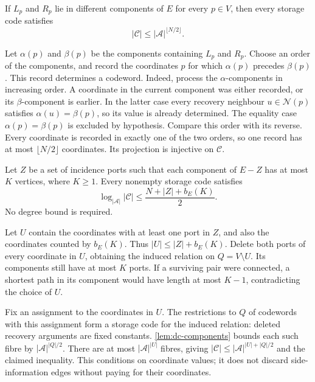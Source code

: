 \begin{lemma}
\label{lem:dc-components}
If $L_p$ and $R_p$ lie in different components of $E$ for every $p\in V$,
then every storage code satisfies
\[
  |\mathcal C|\le |\mathcal A|^{\lfloor N/2\rfloor}.
\]
\end{lemma}
\begin{outline}
Let $\alpha(p)$ and $\beta(p)$ be the components containing $L_p$ and $R_p$.
Choose an order of the components, and record the coordinates $p$ for which
$\alpha(p)$ precedes $\beta(p)$.  This record determines a codeword.
Indeed, process the $\alpha$-components in increasing order.  A coordinate
in the current component was either recorded, or its $\beta$-component is
earlier.  In the latter case every recovery neighbour $u\in\mathcal N(p)$
satisfies $\alpha(u)=\beta(p)$, so its value is already determined.
The equality case $\alpha(p)=\beta(p)$ is excluded by hypothesis.
Compare this order with its reverse. Every coordinate is recorded in exactly
one of the two orders, so one record has at most $\lfloor N/2\rfloor$
coordinates. Its projection is injective on $\mathcal C$.
\end{outline}

\begin{theorem}
\label{thm:dc-separator}
Let $Z$ be a set of incidence ports such that each component of $E-Z$
has at most $K$ vertices, where $K\ge1$.  Every nonempty storage code satisfies
\begin{equation}
 \log_{|\mathcal A|}|\mathcal C|
 \le \frac{N+|Z|+b_E(K)}2.
 \label{eq:dc-separator-bound}
\end{equation}
No degree bound is required.
\end{theorem}
\begin{outline}
Let $U$ contain the coordinates with at least one port in $Z$, and also
the coordinates counted by $b_E(K)$.  Thus $|U|\le |Z|+b_E(K)$.
Delete both ports of every coordinate in $U$, obtaining the induced
relation on $Q=V\setminus U$.  Its components still have at most $K$
ports.  If a surviving pair were connected, a shortest path in its
component would have length at most $K-1$, contradicting the choice of $U$.

Fix an assignment to the coordinates in $U$.  The restrictions to $Q$ of
codewords with this assignment form a storage code for the induced relation:
deleted recovery arguments are fixed constants.  \cref{lem:dc-components}
bounds each such fibre by $|\mathcal A|^{|Q|/2}$.  There are at most
$|\mathcal A|^{|U|}$ fibres, giving
$|\mathcal C|\le |\mathcal A|^{|U|+|Q|/2}$ and the claimed inequality.
This conditions on coordinate values; it does not discard side-information
edges without paying for their coordinates.
\end{outline}

